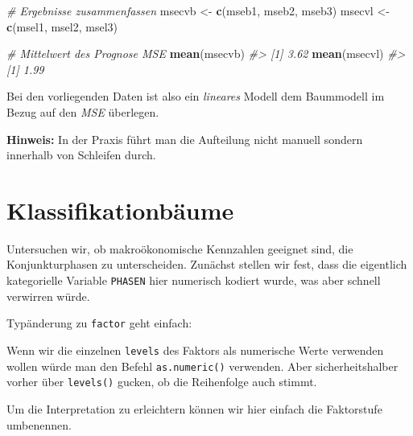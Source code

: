 \documentclass[12pt,]{book}
\newenvironment{Shaded}{\begin{snugshade}}{\end{snugshade}}
\newcommand{\KeywordTok}[1]{\textcolor[rgb]{0.13,0.29,0.53}{\textbf{{#1}}}}
\newcommand{\StringTok}[1]{\textcolor[rgb]{0.31,0.60,0.02}{{#1}}}
\newcommand{\CommentTok}[1]{\textcolor[rgb]{0.56,0.35,0.01}{\textit{{#1}}}}
\newcommand{\NormalTok}[1]{{#1}}
\begin{document}
\begin{Shaded}
\begin{Highlighting}[]
\CommentTok{# Ergebnisse zusammenfassen}
\NormalTok{msecvb <-}\StringTok{ }\KeywordTok{c}\NormalTok{(mseb1, mseb2, mseb3)}
\NormalTok{msecvl <-}\StringTok{ }\KeywordTok{c}\NormalTok{(msel1, msel2, msel3)}

\CommentTok{# Mittelwert des Prognose MSE}
\KeywordTok{mean}\NormalTok{(msecvb)}
\CommentTok{#> [1] 3.62}
\KeywordTok{mean}\NormalTok{(msecvl)}
\CommentTok{#> [1] 1.99}
\end{Highlighting}
\end{Shaded}

Bei den vorliegenden Daten ist also ein \emph{lineares} Modell dem
Baummodell im Bezug auf den \emph{MSE} überlegen.

\textbf{Hinweis:} In der Praxis führt man die Aufteilung nicht manuell
sondern innerhalb von Schleifen durch.

\section{Klassifikationbäume}\label{klassifikationbaume}

Untersuchen wir, ob makroökonomische Kennzahlen geeignet sind, die
Konjunkturphasen zu unterscheiden. Zunächst stellen wir fest, dass die
eigentlich kategorielle Variable \texttt{PHASEN} hier numerisch kodiert
wurde, was aber schnell verwirren würde.

\begin{Shaded}
\end{Shaded}

Typänderung zu \texttt{factor} geht einfach:

\begin{Shaded}
\end{Shaded}

Wenn wir die einzelnen \texttt{levels} des Faktors als numerische Werte
verwenden wollen würde man den Befehl \texttt{as.numeric()} verwenden.
Aber sicherheitshalber vorher über \texttt{levels()} gucken, ob die
Reihenfolge auch stimmt.

Um die Interpretation zu erleichtern können wir hier einfach die
Faktorstufe umbenennen.
\end{document}
